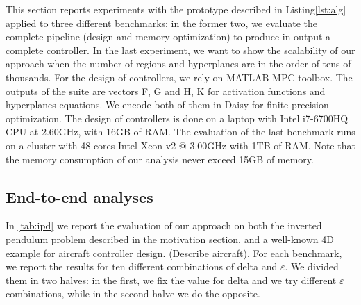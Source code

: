 This section reports experiments with the prototype described in Listing\ref{lst:alg} applied to three different benchmarks: in the former two, we evaluate the complete pipeline (design and memory optimization) to produce in output a complete controller. In the last experiment, we want to show the scalability of our approach when the number of regions and hyperplanes are in the order of tens of thousands.
For the design of controllers, we rely on MATLAB MPC toolbox. The outputs of the suite are vectors F, G and H, K for activation functions and hyperplanes equations. We encode both of them in Daisy for finite-precision optimization.
The design of controllers is done on a laptop with Intel i7-6700HQ CPU at 2.60GHz, with 16GB of RAM. 
The evaluation of the last benchmark runs on a cluster with 48 cores Intel Xeon v2 @ 3.00GHz with 1TB of RAM. Note that the memory consumption of our analysis never exceed 15GB of memory.

\subsection{End-to-end analyses}

In \autoref{tab:ipd} we report the evaluation of our approach on both the inverted pendulum problem described in the motivation section, and a well-known 4D example for aircraft controller design. (Describe aircraft). For each benchmark, we report the results for ten different combinations of delta and $\varepsilon$. We divided them in two halves: in the  first, we fix the value for delta and we try different $\varepsilon$ combinations, while in the second halve we do the opposite.

